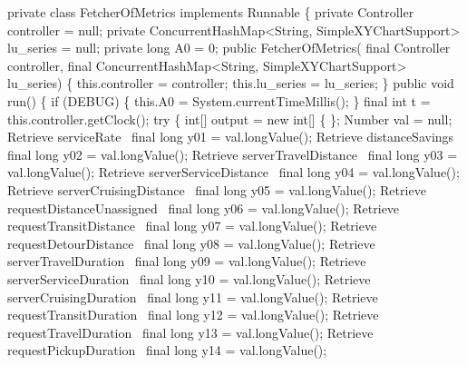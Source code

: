 \nwenddocs{}\plusendmoddef
private class FetcherOfMetrics implements Runnable \{
  private Controller controller = null;
  private ConcurrentHashMap<String, SimpleXYChartSupport> lu_series = null;
  private long A0 = 0;
  public FetcherOfMetrics(
      final Controller controller,
      final ConcurrentHashMap<String, SimpleXYChartSupport> lu_series) \{
    this.controller = controller;
    this.lu_series = lu_series;
  \}
  public void run() \{
    if (DEBUG) \{
      this.A0 = System.currentTimeMillis();
    \}
    final int t = this.controller.getClock();
    try \{
      int[] output = new int[] \{ \};
      Number val = null;
      \LA{}Retrieve serviceRate~{\nwtagstyle{}}\RA{}               final long y01 = val.longValue();
      \LA{}Retrieve distanceSavings~{\nwtagstyle{}}\RA{}           final long y02 = val.longValue();
      \LA{}Retrieve serverTravelDistance~{\nwtagstyle{}}\RA{}      final long y03 = val.longValue();
      \LA{}Retrieve serverServiceDistance~{\nwtagstyle{}}\RA{}     final long y04 = val.longValue();
      \LA{}Retrieve serverCruisingDistance~{\nwtagstyle{}}\RA{}    final long y05 = val.longValue();
      \LA{}Retrieve requestDistanceUnassigned~{\nwtagstyle{}}\RA{} final long y06 = val.longValue();
      \LA{}Retrieve requestTransitDistance~{\nwtagstyle{}}\RA{}    final long y07 = val.longValue();
      \LA{}Retrieve requestDetourDistance~{\nwtagstyle{}}\RA{}     final long y08 = val.longValue();
      \LA{}Retrieve serverTravelDuration~{\nwtagstyle{}}\RA{}      final long y09 = val.longValue();
      \LA{}Retrieve serverServiceDuration~{\nwtagstyle{}}\RA{}     final long y10 = val.longValue();
      \LA{}Retrieve serverCruisingDuration~{\nwtagstyle{}}\RA{}    final long y11 = val.longValue();
      \LA{}Retrieve requestTransitDuration~{\nwtagstyle{}}\RA{}    final long y12 = val.longValue();
      \LA{}Retrieve requestTravelDuration~{\nwtagstyle{}}\RA{}     final long y13 = val.longValue();
      \LA{}Retrieve requestPickupDuration~{\nwtagstyle{}}\RA{}     final long y14 = val.longValue();
